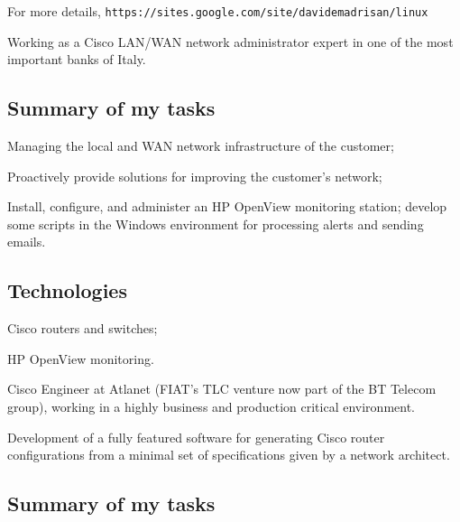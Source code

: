 For more details,
\hfill\break\noindent
{\tt https:/\negthinspace/sites.google.com/site/davidemadrisan/linux}


\vfill\eject


Working as a Cisco LAN/WAN network administrator expert in one of the most
important banks of Italy.

\subsection{Summary of my tasks}

\item{\bdot} Managing the local and WAN network infrastructure of the customer;
\item{\bdot} Proactively provide solutions for improving the customer's network;
\item{\bdot} Install, configure, and administer an HP OpenView monitoring station;
             develop some scripts in the Windows environment for processing alerts
             and sending emails.

\subsection{Technologies}

\item{\bdot} Cisco routers and switches;
\item{\bdot} HP OpenView monitoring.
 


Cisco Engineer at Atlanet (FIAT's TLC venture now part of the BT Telecom group), 
working in a highly business and production critical environment.

Development of a fully featured software for generating Cisco router
configurations from a minimal set of specifications given by a network architect.

\subsection{Summary of my tasks}

